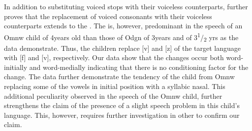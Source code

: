 \documentclass[output=paper,
modfonts
]{langscibook}
\begin{document}
In addition to substituting voiced stops with their voiceless counterparts,  further proves that the replacement of voiced consonants with their voiceless counterparts extends to the . The  is, however, predominant in the speech of an Omnw child of 4years old than those of Odgn of 3years and  of 3\textsuperscript{1}/\textsubscript{2 }yrs as the data demonstrate. Thus, the children replace [v] and [z] of the target language with [f] and [v], respectively. Our data show that the changes occur both word-initially and word-medially indicating that there is no conditioning factor for the change. The data further demonstrate the tendency of the child from Omnw replacing some of the vowels in initial position with a syllabic nasal. This additional peculiarity observed in the speech of the Omnw child, further strengthens the claim of the presence of a slight speech problem in this child’s language. This, however, requires further investigation in other to confirm our claim. 
\end{document}
